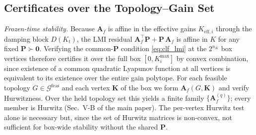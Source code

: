 \documentclass[lettersize,journal]{IEEEtran}
\begin{document}
\subsection{Certificates over the Topology--Gain Set}
\emph{Frozen-time stability.} Because $\mathbf{A}_f$ is affine in the effective gains $K_{\mathrm{eff},i}$ through the damping block $D(K_t)$, the LMI residual $\mathbf{A}_f^{\!\top}\mathbf{P}+\mathbf{P}\,\mathbf{A}_f$ is affine in $K$ for any fixed $\mathbf{P}\succ\mathbf 0$. Verifying the common-$\mathbf{P}$ condition \eqref{eq:clf_lmi} at the $2^{n_K}$ box vertices therefore certifies it over the full box $[0,K_i^{\max}]$ by convex combination, since existence of a common quadratic Lyapunov function at all vertices is equivalent to its existence over the entire gain polytope. For each feasible topology $G\in\mathcal{G}^{\mathrm{feas}}$ and each vertex $\mathbf{K}$ of the box we form $\mathbf{A}_f(G,\mathbf{K})$ and verify Hurwitzness. Over the held topology set this yields a finite family $\{\mathbf{A}_f^{(q)}\}$; every member is Hurwitz (Sec.~V-B of the main paper). The per-vertex Hurwitz test alone is necessary but, since the set of Hurwitz matrices is non-convex, not sufficient for box-wide stability without the shared $\mathbf{P}$.
\end{document}
